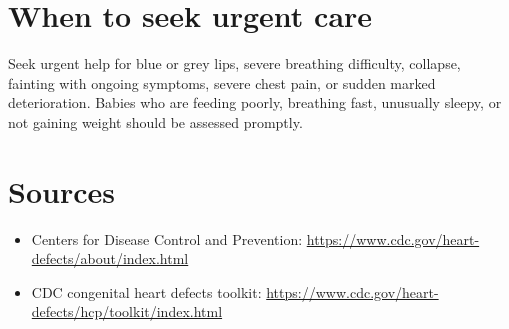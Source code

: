 \section*{When to seek urgent care}
Seek urgent help for blue or grey lips, severe breathing difficulty, collapse, fainting with ongoing symptoms, severe chest pain, or sudden marked deterioration. Babies who are feeding poorly, breathing fast, unusually sleepy, or not gaining weight should be assessed promptly.

\section*{Sources}
\begin{itemize}
\item Centers for Disease Control and Prevention: \url{https://www.cdc.gov/heart-defects/about/index.html}
\item CDC congenital heart defects toolkit: \url{https://www.cdc.gov/heart-defects/hcp/toolkit/index.html}
\end{itemize}
